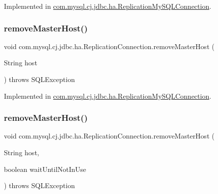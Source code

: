 Implemented in \mbox{\hyperlink{classcom_1_1mysql_1_1cj_1_1jdbc_1_1ha_1_1_replication_my_s_q_l_connection_a0f456ea68e82ca3e3306fd8607ea191e}{com.\+mysql.\+cj.\+jdbc.\+ha.\+Replication\+My\+S\+Q\+L\+Connection}}.

\mbox{\label{interfacecom_1_1mysql_1_1cj_1_1jdbc_1_1ha_1_1_replication_connection_a7e1cf8606d5b42c57ce5dfae63d981e3}} 
\subsubsection{\texorpdfstring{remove\+Master\+Host()}{removeMasterHost()}\hspace{0.1cm}{\footnotesize\ttfamily [1/2]}}
{\footnotesize\ttfamily void com.\+mysql.\+cj.\+jdbc.\+ha.\+Replication\+Connection.\+remove\+Master\+Host (\begin{DoxyParamCaption}\item[{String}]{host }\end{DoxyParamCaption}) throws S\+Q\+L\+Exception}



Implemented in \mbox{\hyperlink{classcom_1_1mysql_1_1cj_1_1jdbc_1_1ha_1_1_replication_my_s_q_l_connection_a0742e97205fb19aa79836326df2b5f47}{com.\+mysql.\+cj.\+jdbc.\+ha.\+Replication\+My\+S\+Q\+L\+Connection}}.

\mbox{\label{interfacecom_1_1mysql_1_1cj_1_1jdbc_1_1ha_1_1_replication_connection_a47341136bcee35fd889a2d568e375756}} 
\subsubsection{\texorpdfstring{remove\+Master\+Host()}{removeMasterHost()}\hspace{0.1cm}{\footnotesize\ttfamily [2/2]}}
{\footnotesize\ttfamily void com.\+mysql.\+cj.\+jdbc.\+ha.\+Replication\+Connection.\+remove\+Master\+Host (\begin{DoxyParamCaption}\item[{String}]{host,  }\item[{boolean}]{wait\+Until\+Not\+In\+Use }\end{DoxyParamCaption}) throws S\+Q\+L\+Exception}



